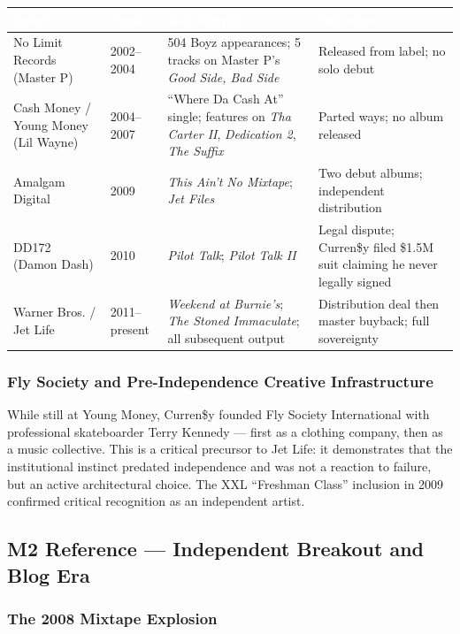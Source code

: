 \documentclass[11pt,letterpaper]{article}
\newcommand{\tableheader}[1]{\textbf{\sffamily\textcolor{white}{#1}}}
\begin{document}
\begin{center}
\begin{tabularx}{\textwidth}{L{2.5cm}L{2cm}L{3cm}X}
\toprule
{}
\tableheader{Label} & \tableheader{Years} & \tableheader{Key Output} & \tableheader{Outcome} \\
\midrule
No Limit Records (Master P) & 2002–2004 & 504 Boyz appearances; 5 tracks on Master P's \textit{Good Side, Bad Side} & Released from label; no solo debut \\
Cash Money / Young Money (Lil Wayne) & 2004–2007 & ``Where Da Cash At'' single; features on \textit{Tha Carter II}, \textit{Dedication 2}, \textit{The Suffix} & Parted ways; no album released \\
Amalgam Digital & 2009 & \textit{This Ain't No Mixtape}; \textit{Jet Files} & Two debut albums; independent distribution \\
DD172 (Damon Dash) & 2010 & \textit{Pilot Talk}; \textit{Pilot Talk II} & Legal dispute; Curren\$y filed \$1.5M suit claiming he never legally signed \\
Warner Bros. / Jet Life & 2011–present & \textit{Weekend at Burnie's}; \textit{The Stoned Immaculate}; all subsequent output & Distribution deal then master buyback; full sovereignty \\
\bottomrule
\end{tabularx}
\end{center}

\subsubsection{Fly Society and Pre-Independence Creative Infrastructure}

While still at Young Money, Curren\$y founded Fly Society International with professional skateboarder Terry Kennedy — first as a clothing company, then as a music collective. This is a critical precursor to Jet Life: it demonstrates that the institutional instinct predated independence and was not a reaction to failure, but an active architectural choice. The XXL ``Freshman Class'' inclusion in 2009 confirmed critical recognition as an independent artist.

\subsection{M2 Reference — Independent Breakout and Blog Era}

\subsubsection{The 2008 Mixtape Explosion}
\end{document}
